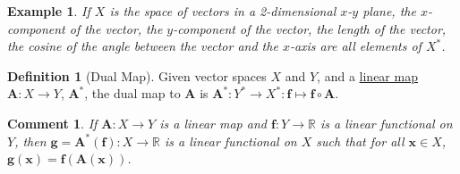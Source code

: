 \documentclass[letterpaper,12pt]{article}
\theoremstyle{plain}
\theoremstyle{plain}
\newtheorem{exmp}{Example}
\newtheorem*{cmnt*}{Comment}
\theoremstyle{definition}
\newtheorem{defn}{Definition}
\begin{document}
\begin{exmp} If $X$ is the space of vectors in a 2-dimensional $x$-$y$ plane, the $x$-component of the vector, the $y$-component of the vector, the length of the vector, the cosine of the angle between the vector and the $x$-axis are all elements of $X^*$.
\end{exmp}

\begin{defn}[Dual Map]\label{defDMap} Given vector spaces $X$ and $Y$, and a \hyperref[deflinfvs]{linear map} $\mathbf{A}:X\rightarrow Y$, $\mathbf{A}^*$, the dual map to $\mathbf{A}$ is $\mathbf{A}^*:Y^*\rightarrow X^*:\mathbf{f}\mapsto \mathbf{f}\circ \mathbf{A}$.
\end{defn}

\begin{cmnt*} If $\mathbf{A}:X\rightarrow Y$ is a linear map and $\mathbf{f}:Y\rightarrow\mathbb{R}$ is a linear functional on $Y$, then $\mathbf{g}=\mathbf{A}^*(\mathbf{f}):X\rightarrow\mathbb{R}$ is a linear functional on $X$ such that for all $\mathbf{x}\in X$, $\mathbf{g}(\mathbf{x})=\mathbf{f}(\mathbf{A}(\mathbf{x}))$.
\end{cmnt*}
\end{document}
